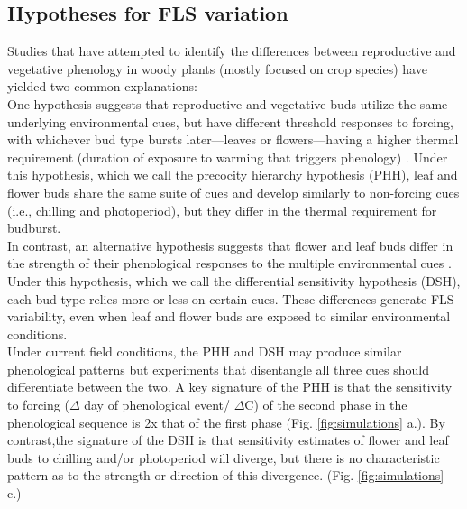 \documentclass[11pt]{article}\usepackage[]{graphicx}\usepackage[]{color}
\begin{document}
\subsection*{Hypotheses for FLS variation}

\noindent Studies that have attempted to identify the differences between reproductive and vegetative phenology in woody plants (mostly focused on crop species) have yielded two common explanations:\\

\noindent One hypothesis suggests that reproductive and vegetative buds utilize the same underlying environmental cues, but have different threshold responses to forcing, with whichever bud type bursts later---leaves or flowers---having a higher thermal requirement (duration of exposure to warming that triggers phenology) \citep{Guo2014,COSMULESCU:2020aa,Cosmulescu:2018aa}. Under this hypothesis, which we call the precocity hierarchy hypothesis (PHH), leaf and flower buds share the same suite of cues and develop similarly to non-forcing cues (i.e., chilling and photoperiod), but they differ in the thermal requirement for budburst.\\

\noindent In contrast, an alternative hypothesis suggests that flower and leaf buds differ in the strength of their phenological responses to the multiple environmental cues \citep{Citadin2001,Gariglio2006,Aslani2009,Mehlenbacher:1991aa}. Under this hypothesis, which we call the differential sensitivity hypothesis (DSH), each bud type relies more or less on certain cues. These differences generate FLS variability, even when leaf and flower buds are exposed to similar environmental conditions.\\ %

\noindent Under current field conditions, the PHH and DSH may produce similar phenological patterns but experiments that disentangle all three cues should differentiate between the two. A key signature of the PHH is that the sensitivity to forcing ($\Delta$ day of phenological event/ $\Delta$\degree C) of the second phase in the phenological sequence is 2x that of the first phase (Fig. \ref{fig:simulations} a.). By contrast,the signature of the DSH is that sensitivity estimates of flower and leaf buds to chilling and/or photoperiod will diverge, but there is no characteristic pattern as to the strength or direction of this divergence. (Fig. \ref{fig:simulations} c.)\\
\end{document}
